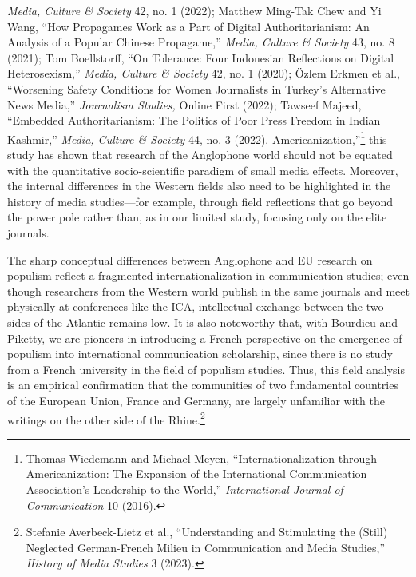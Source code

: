 \documentclass{tufte-handout}
\begin{document}
{{{{{  \emph{Media, Culture \& Society} 42, no. 1 (2022); Matthew Ming-Tak
  Chew and Yi Wang, ``How Propagames Work as a Part of Digital
  Authoritarianism: An Analysis of a Popular Chinese Propagame,''
  \emph{Media, Culture \& Society} 43, no. 8 (2021); Tom Boellstorff,
  ``On Tolerance: Four Indonesian Reflections on Digital Heterosexism,''
  \emph{Media, Culture \& Society} 42, no. 1 (2020); Özlem Erkmen et
  al., ``Worsening Safety Conditions for Women Journalists in Turkey's
  Alternative News Media,'' \emph{Journalism Studies,} Online First
  (2022); Tawseef Majeed, ``Embedded Authoritarianism: The Politics of
  Poor Press Freedom in Indian Kashmir,'' \emph{Media, Culture \&
  Society} 44, no. 3 (2022).} Americanization,''\footnote{Thomas
  Wiedemann and Michael Meyen, ``Internationalization through
  Americanization: The Expansion of the International Communication
  Association's Leadership to the World,'' \emph{International Journal
  of Communication} 10 (2016).} this study has shown that research of
the Anglophone world should not be equated with the quantitative
socio-scientific paradigm of small media effects. Moreover, the internal
differences in the Western fields also need to be highlighted in the
history of media studies---for example, through field reflections that
go beyond the power pole rather than, as in our limited study, focusing
only on the elite journals.

The sharp conceptual differences between Anglophone and EU research on
populism reflect a fragmented internationalization in communication
studies; even though researchers from the Western world publish in the
same journals and meet physically at conferences like the ICA,
intellectual exchange between the two sides of the Atlantic remains low.
It is also noteworthy that, with Bourdieu and Piketty, we are pioneers
in introducing a French perspective on the emergence of populism into
international communication scholarship, since there is no study from a
French university in the field of populism studies. Thus, this field
analysis is an empirical confirmation that the communities of two
fundamental countries of the European Union, France and Germany, are
largely unfamiliar with the writings on the other side of the
Rhine.\footnote{Stefanie Averbeck-Lietz et al., ``Understanding and
  Stimulating the (Still) Neglected German-French Milieu in
  Communication and Media Studies,'' \emph{History of Media Studies} 3
  (2023).}



}}}}
\end{document}
